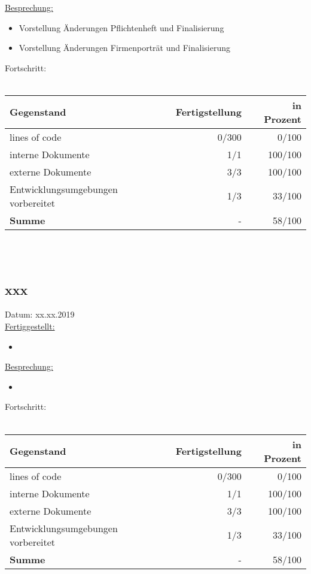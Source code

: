 \documentclass[12pt]{article}
\begin{document}
\uline{Besprechung:}
\begin{itemize}\itemsep0em
\item Vorstellung Änderungen Pflichtenheft und Finalisierung
\item Vorstellung Änderungen Firmenporträt und Finalisierung
\end{itemize}

Fortschritt:\\\\
\begin{tabularx}{\textwidth}{|X|r|r|} \hline
\textbf{Gegenstand}&\textbf{Fertigstellung} & \textbf{in Prozent}\\ \hline
lines of code & 0/300  & 0/100\\ \hline
interne Dokumente & 1/1 & 100/100  \\ \hline
externe Dokumente & 3/3 & 100/100 \\ \hline
Entwicklungsumgebungen vorbereitet & 1/3 & 33/100 \\ \hline
\textbf{Summe} & - & 58/100  \\ \hline
\end{tabularx}\\\\

\newpage
\subsection{xxx}
Datum: xx.xx.2019 \\

\uline{Fertiggestellt:}
\begin{itemize}\itemsep0em
\item 
\end{itemize}

\uline{Besprechung:}
\begin{itemize}\itemsep0em
\item 
\end{itemize}

Fortschritt:\\\\
\begin{tabularx}{\textwidth}{|X|r|r|} \hline
\textbf{Gegenstand}&\textbf{Fertigstellung} & \textbf{in Prozent}\\ \hline
lines of code & 0/300  & 0/100\\ \hline
interne Dokumente & 1/1 & 100/100  \\ \hline
externe Dokumente & 3/3 & 100/100 \\ \hline
Entwicklungsumgebungen vorbereitet & 1/3 & 33/100 \\ \hline
\textbf{Summe} & - & 58/100  \\ \hline
\end{tabularx}\\\\

\newpage


\clearpage
\end{document}
